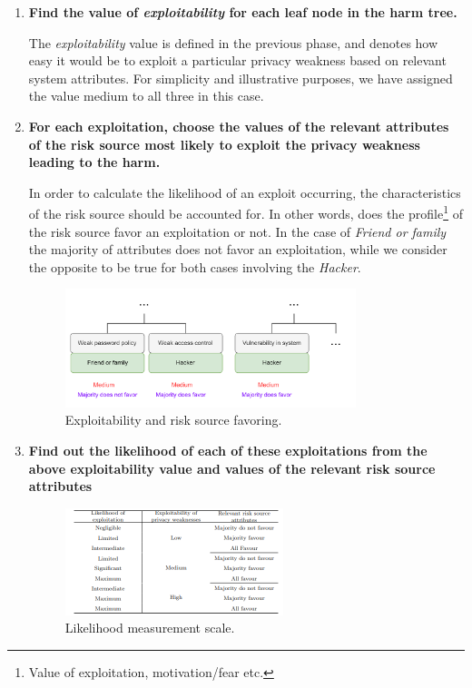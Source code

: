 \begin{enumerate}
  \item{\textbf{Find the value of \textit{exploitability} for each leaf node in the harm tree.}}

       The \textit{exploitability} value is defined in the previous phase, and
       denotes how easy it would be to exploit a particular privacy weakness based on
       relevant system attributes. For simplicity and illustrative purposes,
       we have assigned the value medium to all three in this case.

  \item{\textbf{For each exploitation, choose the values of the relevant attributes of
        the risk source most likely to exploit the privacy weakness leading to the
        harm.}}

        In order to calculate the likelihood of an exploit occurring, the
        characteristics of the risk source should be accounted for. In other words, does
        the profile\footnote{Value of exploitation, motivation/fear etc.} of the risk
        source favor an exploitation or not. In the case of \textit{Friend or family}
        the majority of attributes does not favor an exploitation, while we
        consider the opposite to be true for both cases involving the \textit{Hacker}.

        \begin{figure}[hbt!]
          \centering
          \includegraphics[width=0.8\textwidth]{pictures/step2.png}
          \caption{Exploitability and risk source favoring.}
          \label{fig:favor}
        \end{figure}

  \item{\textbf{Find out the likelihood of each of these exploitations from the above
        exploitability value and values of the relevant risk source attributes}}

        \begin{figure}[hbt!]
          \centering
          \includegraphics[width=0.6\textwidth]{pictures/measurement.png}
          \caption{Likelihood measurement scale.}
          \label{fig:measurement}
        \end{figure}


\end{enumerate}
